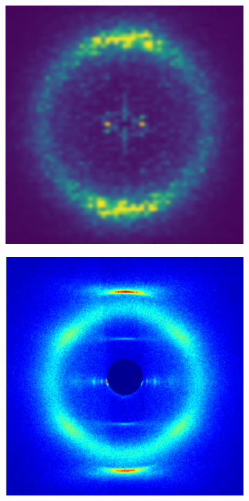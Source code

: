 \documentclass{article}
\begin{document}
\begin{figure}
\medskip

\begin{subfigure}[t]{.3\textwidth}
\centering
\vspace{0pt}%
\includegraphics[width=\linewidth]{WAXS_disordered_pore_qyqz.png}
\caption{}\label{fig:disordered_XRD_sim}
\end{subfigure}
%
\begin{subfigure}[t]{.3\textwidth}
\centering
\vspace{0pt}%
\includegraphics[width=\linewidth]{2DWAXS_experimental.png}

\end{subfigure}
\end{figure}
\end{document}

